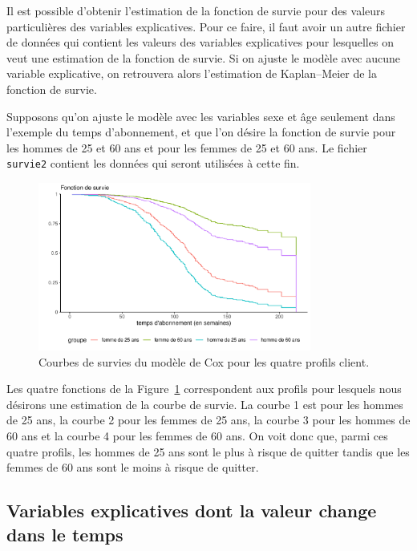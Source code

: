 \documentclass[
  11pt,
  letterpaper,
]{scrbook}
\theoremstyle{definition}
\theoremstyle{remark}
\begin{document}
Il est possible d'obtenir l'estimation de la fonction de survie pour des
valeurs particulières des variables explicatives. Pour ce faire, il faut
avoir un autre fichier de données qui contient les valeurs des variables
explicatives pour lesquelles on veut une estimation de la fonction de
survie. Si on ajuste le modèle avec aucune variable explicative, on
retrouvera alors l'estimation de Kaplan--Meier de la fonction de survie.

Supposons qu'on ajuste le modèle avec les variables sexe et âge
seulement dans l'exemple du temps d'abonnement, et que l'on désire la
fonction de survie pour les hommes de 25 et 60 ans et pour les femmes de
25 et 60 ans. Le fichier \texttt{survie2} contient les données qui
seront utilisées à cette fin.

\begin{figure}[ht!]

{\centering \includegraphics[width=0.8\textwidth,height=\textheight]{survie_files/figure-pdf/fig-courbes-survie-1.pdf}

}

\caption{\label{fig-courbes-survie}Courbes de survies du modèle de Cox
pour les quatre profils client.}

\end{figure}

Les quatre fonctions de la Figure~\ref{fig-courbes-survie} correspondent
aux profils pour lesquels nous désirons une estimation de la courbe de
survie. La courbe 1 est pour les hommes de 25 ans, la courbe 2 pour les
femmes de 25 ans, la courbe 3 pour les hommes de 60 ans et la courbe 4
pour les femmes de 60 ans. On voit donc que, parmi ces quatre profils,
les hommes de 25 ans sont le plus à risque de quitter tandis que les
femmes de 60 ans sont le moins à risque de quitter.

\hypertarget{variables-explicatives-dont-la-valeur-change-dans-le-temps}{%
\subsection{Variables explicatives dont la valeur change dans le
temps}\label{variables-explicatives-dont-la-valeur-change-dans-le-temps}}
\end{document}
